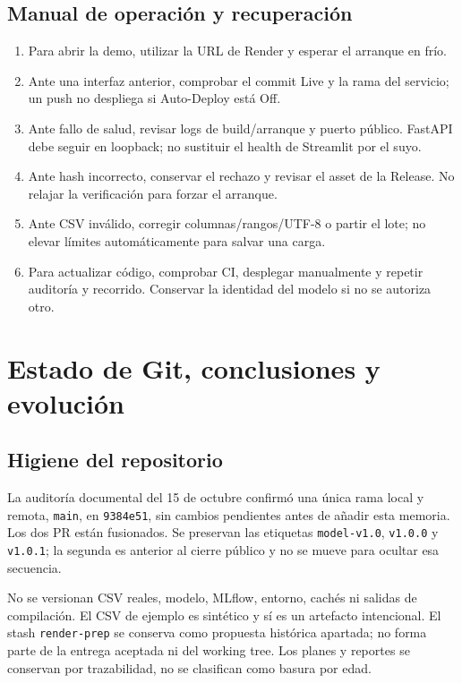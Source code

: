 \documentclass[11pt,a4paper,oneside]{report}
\newcommand{\versioncodigo}{9384e51}
\begin{document}
\section{Manual de operación y recuperación}
\begin{enumerate}
\item Para abrir la demo, utilizar la URL de Render y esperar el arranque en frío.
\item Ante una interfaz anterior, comprobar el commit Live y la rama del servicio;
  un push no despliega si Auto-Deploy está Off.
\item Ante fallo de salud, revisar logs de build/arranque y puerto público.
  FastAPI debe seguir en loopback; no sustituir el health de Streamlit por el suyo.
\item Ante hash incorrecto, conservar el rechazo y revisar el asset de la Release.
  No relajar la verificación para forzar el arranque.
\item Ante CSV inválido, corregir columnas/rangos/UTF-8 o partir el lote; no elevar
  límites automáticamente para salvar una carga.
\item Para actualizar código, comprobar CI, desplegar manualmente y repetir
  auditoría y recorrido. Conservar la identidad del modelo si no se autoriza otro.
\end{enumerate}

\chapter{Estado de Git, conclusiones y evolución}
\section{Higiene del repositorio}
La auditoría documental del 15 de octubre confirmó una única rama local y
remota, \texttt{main}, en \texttt{\versioncodigo}, sin cambios pendientes antes
de añadir esta memoria. Los dos PR están fusionados. Se preservan las etiquetas
\texttt{model-v1.0}, \texttt{v1.0.0} y \texttt{v1.0.1}; la segunda es anterior
al cierre público y no se mueve para ocultar esa secuencia.

No se versionan CSV reales, modelo, MLflow, entorno, cachés ni salidas de
compilación. El CSV de ejemplo es sintético y sí es un artefacto intencional.
El stash \texttt{render-prep} se conserva como propuesta histórica apartada;
no forma parte de la entrega aceptada ni del working tree. Los planes y
reportes se conservan por trazabilidad, no se clasifican como basura por edad.
\end{document}
